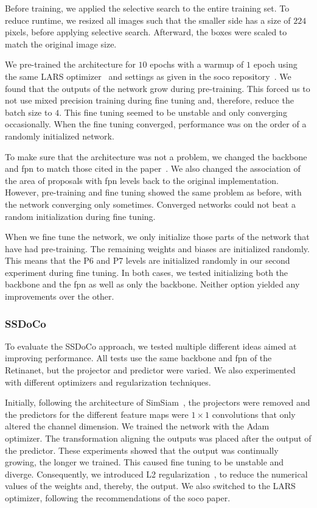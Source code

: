 Before training, we applied the selective search to the entire training set. To reduce runtime, we resized all images such that the smaller side has a size of $224$ pixels, before applying selective search. Afterward, the boxes were scaled to match the original image size.

We pre-trained the architecture for $10$ epochs with a warmup of $1$ epoch using the same LARS optimizer~\cite{You:2017aaa} and settings as given in the \acrshort{soco} repository~\cite{Wei:2022aaa}. We found that the outputs of the network grow during pre-training. This forced us to not use mixed precision training during fine tuning and, therefore, reduce the batch size to $4$. This fine tuning seemed to be unstable and only converging occasionally. When the fine tuning converged, performance was on the order of a randomly initialized network.

To make sure that the architecture was not a problem, we changed the backbone and \acrshort{fpn} to match those cited in the paper~\cite{Wei:2021aaa}. We also changed the association of the area of proposals with \acrshort{fpn} levels back to the original implementation. However, pre-training and fine tuning showed the same problem as before, with the network converging only sometimes. Converged networks could not beat a random initialization during fine tuning.

When we fine tune the network, we only initialize those parts of the network that have had pre-training. The remaining weights and biases are initialized randomly. This means that the P6 and P7 levels are initialized randomly in our second experiment during fine tuning. In both cases, we tested initializing both the backbone and the \acrshort{fpn} as well as only the backbone. Neither option yielded any improvements over the other.

\subsubsection{SSDoCo}
To evaluate the SSDoCo approach, we tested multiple different ideas aimed at improving performance. All tests use the same backbone and \acrshort{fpn} of the Retinanet, but the projector and predictor were varied. We also experimented with different optimizers and regularization techniques.

Initially, following the architecture of SimSiam~\cite{Chen:2020aaa}, the projectors were removed and the predictors for the different feature maps were $1\times 1$ convolutions that only altered the channel dimension. We trained the network with the Adam~\cite{Kingma:2014aaa} optimizer. The transformation aligning the outputs was placed after the output of the predictor. These experiments showed that the output was continually growing, the longer we trained. This caused fine tuning to be unstable and diverge. Consequently, we introduced L2 regularization~\cite{Ng:2004aaa}, to reduce the numerical values of the weights and, thereby, the output. We also switched to the LARS~\cite{You:2017aaa} optimizer, following the recommendations of the \acrshort{soco} paper.

